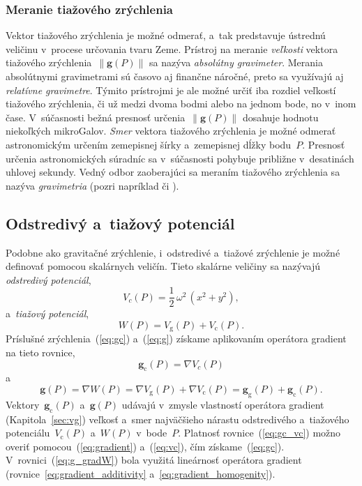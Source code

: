 \documentclass[a4paper,12pt]{book}
\newcommand{\gidx}{\mathrm g}
\newcommand{\cidx}{\mathrm c}
\let\vec\mathbf
\begin{document}
\subsubsection{Meranie tiažového zrýchlenia}

Vektor tiažového zrýchlenia je možné odmerať, a~tak predstavuje ústrednú 
veličinu v~procese určovania tvaru Zeme.  Prístroj na meranie \emph{veľkosti} 
vektora tiažového zrýchlenia~$\| \vec g(P) \|$ sa nazýva \emph{absolútny 
gravimeter}.  Merania absolútnymi gravimetrami sú časovo aj finančne náročné, 
preto sa využívajú aj \emph{relatívne gravimetre}.  Týmito prístrojmi je ale 
možné určiť iba rozdiel veľkostí tiažového zrýchlenia, či už medzi dvoma bodmi 
alebo na jednom bode, no v~inom čase.  V~súčasnosti bežná presnosť určenia~$\| 
\vec g(P) \|$ dosahuje hodnotu niekoľkých mikroGalov.  \emph{Smer} vektora 
tiažového zrýchlenia je možné odmerať astronomickým určením zemepisnej šírky 
a~zemepisnej dĺžky bodu~$P$.  Presnosť určenia astronomických súradníc sa 
v~súčasnosti pohybuje približne v~desatinách uhlovej sekundy.    Vedný odbor 
zaoberajúci sa meraním tiažového zrýchlenia sa nazýva \emph{gravimetria} (pozri 
napríklad \cite{Torge1989,Rozimant1994} či \cite{Janak2010}).  






\subsection{Odstredivý a~tiažový potenciál}
\label{sec:centrifugal_and_gravity_potential}

Podobne ako gravitačné zrýchlenie, i~odstredivé a~tiažové zrýchlenie je
možné definovať pomocou skalárnych veličín.  Tieto skalárne veličiny sa
nazývajú \emph{odstredivý potenciál},
%
\begin{equation}
\label{eq:vc}
V_c(P) = \frac{1}{2} \, \omega^2 \, (x^2 + y^2){,}
\end{equation}
%
a~\emph{tiažový potenciál},
%
\begin{equation}
\label{eq:w}
W(P) = V_\gidx(P) + V_\cidx(P){.}
\end{equation}
%
Príslušné zrýchlenia~(\ref{eq:gc}) a~(\ref{eq:g}) získame aplikovaním operátora
gradient na tieto rovnice,
%
\begin{equation}
\label{eq:gc_vc}
\vec g_\cidx(P) = \nabla V_c(P)
\end{equation}
%
a
%
\begin{equation}
\label{eq:g_gradW}
\vec g(P) = \nabla W(P) = \nabla V_\gidx(P) + \nabla V_\cidx(P) = \vec
g_\gidx(P) + \vec g_\cidx(P){.}
\end{equation}
%
Vektory~$\vec g_\cidx(P)$ a~$\vec g(P)$ udávajú v~zmysle vlastností operátora 
gradient (Kapitola~\ref{sec:vg}) veľkosť a~smer najväčšieho nárastu
odstredivého a~tiažového potenciálu~$V_\cidx(P)$ a~$W(P)$ v~bode~$P$.  Platnosť
rovnice~(\ref{eq:gc_vc}) možno overiť pomocou~(\ref{eq:gradient})
a~(\ref{eq:vc}), čím získame~(\ref{eq:gc}).  V~rovnici~(\ref{eq:g_gradW}) bola
využitá lineárnosť operátora gradient (rovnice~\ref{eq:gradient_additivity} 
a~\ref{eq:gradient_homogenity}).
\end{document}
